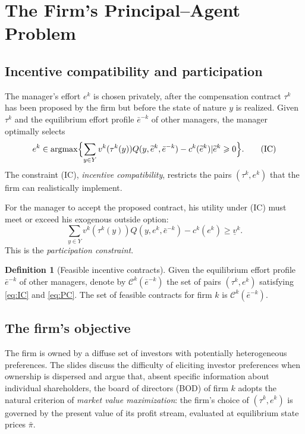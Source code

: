 \documentclass[11pt,a4paper,oneside]{book}
\def\geq{\geqslant}
\DeclareMathOperator*{\argmax}{argmax}
\theoremstyle{plain}
\theoremstyle{definition}
\newtheorem{definition}[theorem]{Definition}
\theoremstyle{remark}
\numberwithin{equation}{chapter}
\begin{document}
\section{The Firm's Principal--Agent Problem}
\label{sec:MQ08-PA}

\subsection{Incentive compatibility and participation}

The manager's effort $e^k$ is chosen privately, after the compensation contract $\tau^k$ has been proposed by the firm but before the state of nature $y$ is realized.
Given $\tau^k$ and the equilibrium effort profile $\bar{e}^{-k}$ of other managers, the manager optimally selects
\begin{equation*}
  e^k \in \argmax \Bigl\{ \sum_{y \in Y} v^k(\tau^k(y)) Q(y, \widetilde{e}^k, \bar{e}^{-k}) - c^k(\widetilde{e}^k) \vert \widetilde{e}^k \geq 0 \Bigr\}.
  \tag{IC}\label{eq:IC}
\end{equation*}
The constraint (IC), \emph{incentive compatibility}, restricts the pairs $(\tau^k, e^k)$ that the firm can realistically implement.

For the manager to accept the proposed contract, his utility under (IC) must meet or exceed his exogenous outside option:
\begin{equation*}
  \sum_{y \in Y} v^k(\tau^k(y)) Q(y, e^k, \bar{e}^{-k}) - c^k(e^k) \geq \underline{v}^k.
  \tag{PC}\label{eq:PC}
\end{equation*}
This is the \emph{participation constraint}.

\begin{definition}[Feasible incentive contracts]\label{def:feasible-contracts}
Given the equilibrium effort profile $\bar{e}^{-k}$ of other managers, denote by $\mathcal{C}^k(\bar{e}^{-k})$ the set of pairs $(\tau^k, e^k)$ satisfying \eqref{eq:IC} and \eqref{eq:PC}.
The set of feasible contracts for firm $k$ is $\mathcal{C}^k(\bar{e}^{-k})$.
\end{definition}

\subsection{The firm's objective}

The firm is owned by a diffuse set of investors with potentially heterogeneous preferences.
The slides discuss the difficulty of eliciting investor preferences when ownership is dispersed and argue that, absent specific information about individual shareholders, the board of directors (BOD) of firm $k$ adopts the natural criterion of \emph{market value maximization}: the firm's choice of $(\tau^k, e^k)$ is governed by the present value of its profit stream, evaluated at equilibrium state prices $\bar{\pi}$.
\end{document}
